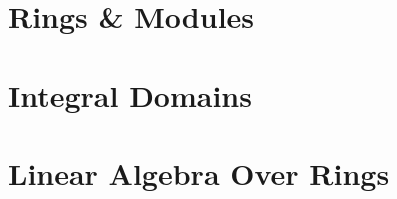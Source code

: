 \documentclass[../../../deep-dive]{subfiles}
\begin{document}
\chapter{Rings \& Modules}





\chapter{Integral Domains}



\chapter{Linear Algebra Over Rings}



\end{document}
